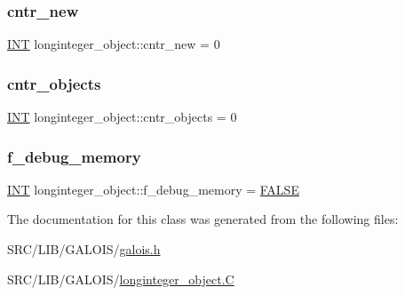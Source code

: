 \subsubsection{\texorpdfstring{cntr\+\_\+new}{cntr\_new}}
{\footnotesize\ttfamily \mbox{\hyperlink{galois_8h_a09fddde158a3a20bd2dcadb609de11dc}{I\+NT}} longinteger\+\_\+object\+::cntr\+\_\+new = 0\hspace{0.3cm}{\ttfamily [static]}}

\mbox{\label{classlonginteger__object_a15690c1068b34d70fe20e1ce13e0b8f3}} 
\subsubsection{\texorpdfstring{cntr\+\_\+objects}{cntr\_objects}}
{\footnotesize\ttfamily \mbox{\hyperlink{galois_8h_a09fddde158a3a20bd2dcadb609de11dc}{I\+NT}} longinteger\+\_\+object\+::cntr\+\_\+objects = 0\hspace{0.3cm}{\ttfamily [static]}}

\mbox{\label{classlonginteger__object_ae0f4bd0c27639c7350a9b36d3cb32823}} 
\subsubsection{\texorpdfstring{f\+\_\+debug\+\_\+memory}{f\_debug\_memory}}
{\footnotesize\ttfamily \mbox{\hyperlink{galois_8h_a09fddde158a3a20bd2dcadb609de11dc}{I\+NT}} longinteger\+\_\+object\+::f\+\_\+debug\+\_\+memory = \mbox{\hyperlink{nauty_8h_aa93f0eb578d23995850d61f7d61c55c1}{F\+A\+L\+SE}}\hspace{0.3cm}{\ttfamily [static]}}



The documentation for this class was generated from the following files\+:\begin{DoxyCompactItemize}
\item 
S\+R\+C/\+L\+I\+B/\+G\+A\+L\+O\+I\+S/\mbox{\hyperlink{galois_8h}{galois.\+h}}\item 
S\+R\+C/\+L\+I\+B/\+G\+A\+L\+O\+I\+S/\mbox{\hyperlink{longinteger__object_8_c}{longinteger\+\_\+object.\+C}}\end{DoxyCompactItemize}
